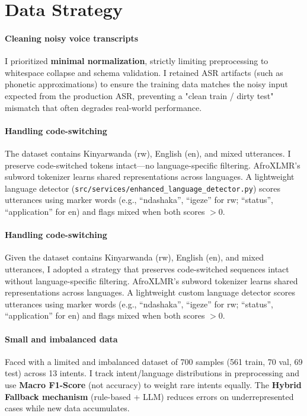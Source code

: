 \documentclass[11pt]{article}
\begin{document}
\section*{Data Strategy}

\paragraph{Cleaning noisy voice transcripts}
I prioritized \textbf{minimal normalization}, strictly limiting preprocessing to whitespace collapse and schema validation. I retained ASR artifacts (such as phonetic approximations) to ensure the training data matches the noisy input expected from the production ASR, preventing a "clean train / dirty test" mismatch that often degrades real-world performance.

\paragraph{Handling code-switching}
The dataset contains Kinyarwanda (rw), English (en), and mixed utterances. I preserve code-switched tokens intact---no language-specific filtering. AfroXLMR's subword tokenizer learns shared representations across languages. A lightweight language detector (\texttt{src/services/enhanced\_language\_detector.py}) scores utterances using marker words (e.g., ``ndashaka'', ``igeze'' for rw; ``status'', ``application'' for en) and flags mixed when both scores $>$0.

\paragraph{Handling code-switching}
Given the dataset contains Kinyarwanda (rw), English (en), and mixed utterances, I adopted a strategy that preserves code-switched sequences intact without language-specific filtering. AfroXLMR's subword tokenizer learns shared representations across languages. A lightweight custom language detector scores utterances using marker words (e.g., ``ndashaka'', ``igeze'' for rw; ``status'', ``application'' for en) and flags mixed when both scores $>$0.

\paragraph{Small and imbalanced data}
Faced with a limited and imbalanced dataset of 700 samples (561 train, 70 val, 69 test) across 13 intents. I track intent/language distributions in preprocessing and use \textbf{Macro F1-Score} (not accuracy) to weight rare intents equally. The \textbf{Hybrid Fallback mechanism} (rule-based + LLM) reduces errors on underrepresented cases while new data accumulates.
\end{document}
